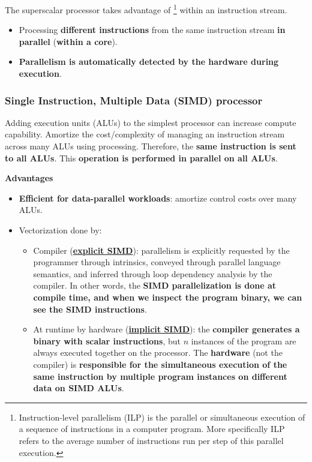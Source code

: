 \noindent
The superscalar processor takes advantage of \footnote{Instruction-level parallelism (ILP) is the parallel or simultaneous execution of a sequence of instructions in a computer program. More specifically ILP refers to the average number of instructions run per step of this parallel execution.} within an instruction stream.
\begin{itemize}
    \item Processing \textbf{different instructions} from the same instruction stream \textbf{in parallel} (\textbf{within a core}).
    \item \textbf{Parallelism is automatically detected by the hardware during execution}.
\end{itemize}

\newpage

\subsubsection{Single Instruction, Multiple Data (SIMD) processor}

Adding execution units (ALUs) to the simplest processor can increase compute capability. Amortize the cost/complexity of managing an instruction stream across many ALUs using  processing. Therefore, the \textbf{same instruction is sent to all ALUs}. This \textbf{operation is performed in parallel on all ALUs}.

\begin{flushleft}
    \textcolor{Green3}{ \textbf{Advantages}}
\end{flushleft}
\begin{itemize}
    \item \textbf{Efficient for data-parallel workloads}: amortize control costs over many ALUs.
    \item Vectorization done by:
    \begin{itemize}
        \item Compiler (\textbf{\underline{explicit SIMD}}): parallelism is explicitly requested by the programmer through intrinsics, conveyed through parallel language semantics, and inferred through loop dependency analysis by the  compiler. In other words, the \textbf{SIMD parallelization is done at compile time, and when we inspect the program binary, we can see the SIMD instructions}.

        \item At runtime by hardware (\textbf{\underline{implicit SIMD}}): the \textbf{compiler generates a binary with scalar instructions}, but $n$ instances of the program are always executed together on the processor. The \textbf{hardware} (not the compiler) is \textbf{responsible for the simultaneous execution of the same instruction by multiple program instances on different data on SIMD ALUs}.
    \end{itemize}
\end{itemize}

